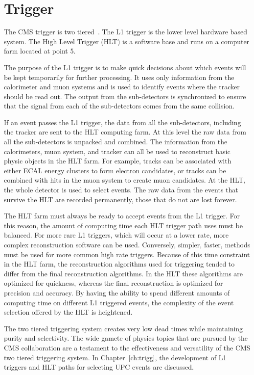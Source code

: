   \section{\label{sec:detTrg}Trigger}
    The CMS trigger is two tiered~\cite{Dasu:2000ge,Sphicas:2002gg}. 
    The L1 trigger is the lower level hardware based system. 
    The High Level Trigger (HLT) is a software base and runs on a computer farm
      located at point 5.

    The purpose of the L1 trigger is to make quick decisions about which events
      will be kept temporarily for further processing.
    It uses only information from the calorimeter and muon systems and is used
      to identify events where the tracker should be read out.
    The output from the sub-detectors is synchronized to ensure that the signal
      from each of the sub-detectors comes from the same collision. 

    If an event passes the L1 trigger, the data from all the sub-detectors,
      including the tracker are sent to the HLT computing farm. 
    At this level the raw data from all the sub-detectors is unpacked and 
      combined.
    The information from the calorimeters, muon system, and tracker can all 
      be used to reconstruct basic physic objects in the HLT farm. 
    For example, tracks can be associated with either ECAL energy clusters to 
      form electron candidates, or tracks can be combined with hits in the muon
      system to create muon candidates.
    At the HLT, the whole detector is used to select events.
    The raw data from the events that survive the HLT are recorded permanently,
      those that do not are lost forever. 

    The HLT farm must always be ready to accept events from the L1 trigger.
    For this reason, the amount of computing time each HLT trigger path uses
      must be balanced.
    For more rare L1 triggers, which will occur at a lower rate, more 
      complex reconstruction software can be used.
    Conversely, simpler, faster, methods must be used for more common high
      rate triggers. 
    Because of this time constraint in the HLT farm, the reconstruction 
      algorithms used for triggering tended to differ from the final 
      reconstruction algorithms.
    In the HLT these algorithms are optimized for quickness, whereas the final 
      reconstruction is optimized for precision and accuracy.
    By having the ability to spend different amounts of computing time on 
      different L1 triggered events, the complexity of the event selection 
      offered by the HLT is heightened. 

    The two tiered triggering system creates very low dead times while 
      maintaining purity and selectivity.
    The wide gamete of physics topics that are pursued by the CMS collaboration
      are a testament to the effectiveness and versatility of the CMS two 
      tiered triggering system.
    In Chapter~\ref{ch:trigg}, the development of L1 triggers and HLT paths 
      for selecting UPC events are discussed. 
